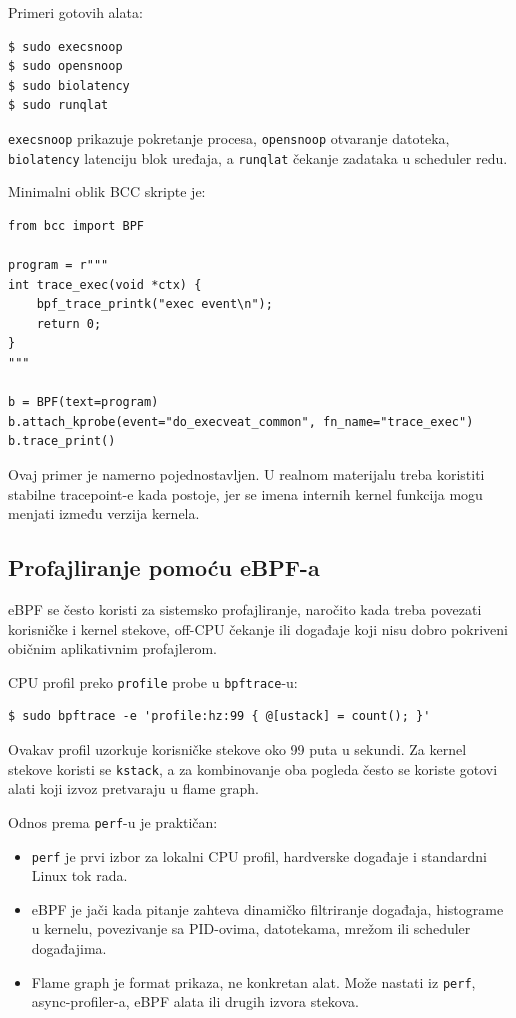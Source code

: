 Primeri gotovih alata:

\begin{verbatim}
$ sudo execsnoop
$ sudo opensnoop
$ sudo biolatency
$ sudo runqlat
\end{verbatim}

\texttt{execsnoop} prikazuje pokretanje procesa, \texttt{opensnoop} otvaranje datoteka, \texttt{biolatency} latenciju blok uređaja, a \texttt{runqlat} čekanje zadataka u scheduler redu.

Minimalni oblik BCC skripte je:

\begin{verbatim}
from bcc import BPF

program = r"""
int trace_exec(void *ctx) {
    bpf_trace_printk("exec event\n");
    return 0;
}
"""

b = BPF(text=program)
b.attach_kprobe(event="do_execveat_common", fn_name="trace_exec")
b.trace_print()
\end{verbatim}

Ovaj primer je namerno pojednostavljen. U realnom materijalu treba koristiti stabilne tracepoint-e kada postoje, jer se imena internih kernel funkcija mogu menjati između verzija kernela.

\subsection{Profajliranje pomoću eBPF-a}\label{ebpf-profajliranje}

eBPF se često koristi za sistemsko profajliranje, naročito kada treba povezati korisničke i kernel stekove, off-CPU čekanje ili događaje koji nisu dobro pokriveni običnim aplikativnim profajlerom.

CPU profil preko \texttt{profile} probe u \texttt{bpftrace}-u:

\begin{verbatim}
$ sudo bpftrace -e 'profile:hz:99 { @[ustack] = count(); }'
\end{verbatim}

Ovakav profil uzorkuje korisničke stekove oko 99 puta u sekundi. Za kernel stekove koristi se \texttt{kstack}, a za kombinovanje oba pogleda često se koriste gotovi alati koji izvoz pretvaraju u flame graph.

Odnos prema \texttt{perf}-u je praktičan:

\begin{itemize}
\tightlist
\item
  \texttt{perf} je prvi izbor za lokalni CPU profil, hardverske događaje i standardni Linux tok rada.
\item
  eBPF je jači kada pitanje zahteva dinamičko filtriranje događaja, histograme u kernelu, povezivanje sa PID-ovima, datotekama, mrežom ili scheduler događajima.
\item
  Flame graph je format prikaza, ne konkretan alat. Može nastati iz \texttt{perf}, async-profiler-a, eBPF alata ili drugih izvora stekova.
\end{itemize}

